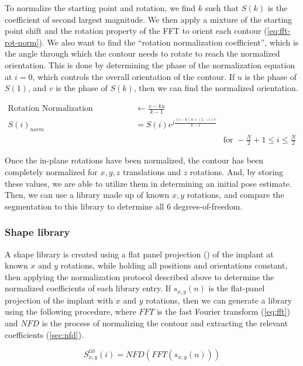 To normalize the starting point and rotation, we find $k$ such that $S(k)$ is the coefficient of second largest magnitude.
We then apply a mixture of the starting point shift and the rotation property of the FFT to orient each contour (\cref{eq:fft-rot-norm}).
We also want to find the ``rotation normalization coefficient'', which is the angle through which the contour needs to rotate to reach the normalized orientation.
This is done by determining the phase of the normalization equation at $i = 0$, which controls the overall orientation of the contour. If $u$ is the phase of $S(1)$, and $v$ is the phase of $S(k)$, then we can find the normalized orientation.

\begin{equation}
    \begin{aligned}
    \text{Rotation Normalization Coefficient} &\leftarrow \frac{v - ku}{k-1}\\
    S(i)_{norm} &= S(i)e^{j\frac{(i-k)u + (1-i)v}{k-1}} & \\
    & & \text{for } - \frac{N}{2}+1 \le i \le \frac{N}{2}
    \end{aligned}
    \label{eq:fft-rot-norm}
\end{equation}

Once the in-plane rotations have been normalized, the contour has been completely normalized for $x, y,z$ translations and $z$ rotations. And, by storing these values, we are able to utilize them in determining an initial pose estimate. Then, we can use a library made up of known $x,y$ rotations, and compare the segmentation to this library to determine all 6 degrees-of-freedom.

\subsubsection{Shape library}
A shape library is created using a flat panel projection () of the implant at known $x$ and $y$ rotations, while holding all positions and orientations constant, then applying the normalization protocol described above to determine the normalized coefficients of each library entry. If $s_{x,y}(n)$ is the flat-panel projection of the implant with $x$ and $y$ rotations, then we can generate a library using the following procedure, where $FFT$ is the fast Fourier transform (\cref{eq:fft}) and $NFD$ is the process of normalizing the contour and extracting the relevant coefficients (\cref{sec:nfd}).

\begin{equation}
    S^{lib}_{x,y}(i) = NFD(FFT(s_{x,y}(n)))
    \label{eq:lib-generation}
\end{equation}

